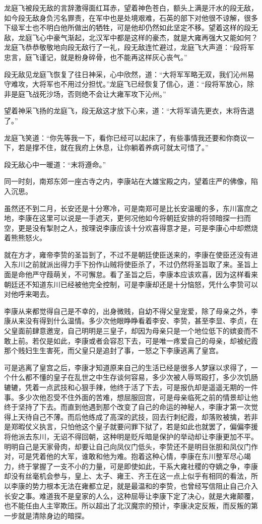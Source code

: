龙庭飞被段无敌的言辞激得面红耳赤，望着神色苍白，额头上满是汗水的段无敌，如今段无敌身负污名罪责，在军中也是处境艰难，石英的部下对他很不谅解，很多下级军士也不明白他所做出的牺牲，可是他却仍然如此坚定不移。望着这样的段无敌，龙庭飞心中豪气渐起，北汉军中都是这样的豪杰，就是大雍再强大又能如何？龙庭飞恭恭敬敬地向段无敌行了一礼，段无敌连忙避过，龙庭飞大声道：“段将军忠言，庭飞谨记，就是粉身碎骨，也不能再这样灰心丧气。”

段无敌见龙庭飞恢复了往日神采，心中欣然，道：“大将军军略无双，我们沁州易守难攻，大将军也不用过分担忧。”龙庭飞已经恢复了信心，道：“段将军放心，除非是庭飞战死沙场，否则绝不会让大雍军攻下沁州。”

望着神采飞扬的龙庭飞，段无敌这才放下心来，道：“大将军请先更衣，末将告退了。”

龙庭飞笑道：“你先等我一下，看你已经可以起床了，有些事情我还要和你商议一下，若是撑不住，就在我府上休息，让你躺着养病可就太可惜了。”

段无敌心中一暖道：“末将遵命。”

同一时刻，南郑东郊一座古寺之内，李康站在大雄宝殿之内，望着庄严的佛像，陷入沉思。

虽然还不到二月，长安还是十分寒冷，可是南郑可是比长安温暖的多，东川富庶之地，李康在这里可以说是一手遮天，更何况他如今将朝廷安排的将领暗探一扫而空，更是没有掣肘之人，按理说李康应该十分欢喜得意才是，可是李康心中却燃烧着熊熊怒火。

就在方才，雍帝李贽的圣旨到了，不过不是朝廷使臣送来的，李康在使臣还没有进入东川之前就派出得力手下扮作山贼将使臣杀了，不过仍然将圣旨取了来。圣旨上面是命他严守葭萌关，不可懈怠。看了圣旨之后，李康本应该欢喜，因为这样看来朝廷还不知道东川已经被他完全控制，可是李康却还是十分恼怒，凭什么李贽可以对他呼来喝去。

李康从来都觉得自己是不幸的，出身微贱，自幼不得父皇宠爱，除了母亲之外，李康从来没有得到什么温情。多少次他眼睁睁看着李安、李贽，甚至李显、李贞，在父皇面前肆意邀宠，自己明明是三皇子，却因为母亲只是一个地位低下的嫔妾而不敢上前。若仅是如此，李康或者会容忍下去，可是唯一疼爱自己的母亲，却被纪霞那个贱妇生生害死，而父皇只是追封了事，一怒之下李康逃离了皇宫。

可是逃离了皇宫之后，李康才知道原来自己的生活已经是很多人梦寐以求得了，一个什么都不懂的皇子在乱世之中生存谈何容易，多少次被人辱骂殴打，多少次饥肠辘辘，凭着一点武技和心狠手辣，他终于活了下去，可是报仇却是遥遥无期的一件事。多少次他忍受不住外面的苦难，想屈服回宫，可是母亲临死之前的情景却让他终于坚持了下去。而直到他遇到那个改变了自己的命运的神秘人，李康才第一次觉得上天待自己不薄。而后他练成了高深的武技，回去行刺纪霞，却落败被擒，若非是郑暇仗义执言，只怕他这个皇子就要问罪下狱了，若是如此也就罢了，偏偏李援将他派去东川，无诏不得回朝，这种明是贬斥暗是保护的举动却让李康更加不平。明明自己是天家骨肉，却要让自己向凤仪门低头，李贽还不是明目张胆和凤仪门作对，可是凭着他的大军，谁敢和他为难。抱着这种心情，李康在东川整军尽心竭力，终于掌握了一支不小的力量，可是即使如此，干系大雍社稷的夺嫡之争，李康却没有丝毫机会参与，皇上、太子、雍王、齐王在这一点上似乎有相同的看法，所以李康的势力根本无法在雍都立足，就是最温和的李贽，也曾经写信阻止自己介入长安之事。难道我不是皇家的人么，这种屈辱让李康下定了决心，就是大雍颠覆，也不能任由人主宰欺压。所以超出了北汉魔宗的预计，李康决定反叛，而反叛的第一步就是清除身边的暗探。

